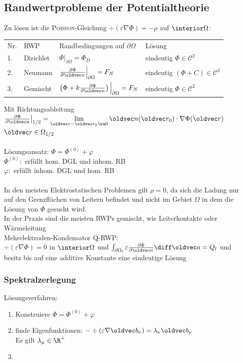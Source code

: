 \documentclass[6pt,a4paper]{scrartcl}
\let\vec\oldvec
\begin{document}
\begin{multicols}{4}
	\subsection{Randwertprobleme der Potentialtheorie}
	Zu lösen ist die \textsc{Poisson}-Gleichung $\div(\varepsilon \nabla \Phi) = -\rho$ auf $\interior \Omega$:\\
	\begin{tabular*}{\columnwidth}{@{\extracolsep\fill}llll@{}}
	Nr. & RWP & Randbedingungen auf $\partial \Omega$ & Lösung\\
	1. & Dirichlet & $\Phi\big|_{\partial\Omega} = \Phi_D$ & eindeutig $\Phi \in \mathcal C^2$\\[0.5em]
	2. & Neumann & $\frac{\partial \Phi}{\partial \vec n}\Big|_{\partial\Omega} = F_N$ & eindeutig $(\Phi + C) \in \mathcal C^2$\\[0.5em]
	3. & Gemischt & $\left( \Phi + k \frac{\partial \Phi}{\partial \vec n}\right)\Big|_{\partial\Omega} = F_N$ & eindeutig $\Phi \in \mathcal C^2$\\
	\end{tabular*} 
	Mit Richtungsableitung $\frac{\partial \Phi}{\partial \vec n}\big|_{1/2} = \lim\limits_{\vec r - \vec r_0 \ra 0} \vec n(\vec r_0) \cdot \nabla\Phi(\vec r)$ \quad $\vec r \in \Omega_{1/2}$\\
	\\
	Lösungsansatz: $\Phi = \Phi^{(0)} + \varphi$\\
	$\Phi^{(0)}:$ erfüllt hom. DGL und inhom. RB\\
	$\varphi:$ erfüllt inhom. DGL und hom. RB\\
	\\
	In den meisten Elektrostatischen Problemen gilt $\rho = 0$, da sich die Ladung nur auf den Grenzflächen von Leitern befindet und nicht im Gebiet $\Omega$ in dem die Lösung von $\Phi$ gesucht wird.\\
	In der Praxis sind die meisten RWPs gemischt, wie Leiterkontakte oder Wärmeleitung\\ 
	
	Mehrelektroden-Kondensator Q-RWP:\\
	$\div(\varepsilon \nabla \Phi) = 0$ in $\interior \Omega$ und $\int_{\partial \Omega_l} \varepsilon \frac{\partial \Phi}{\partial \vec n} \diff \vec a = Q_l$ und  besitz bis auf eine additive Konstante eine eindeutige Lösung
	
	\subsubsection*{Spektralzerlegung}
	Lösungsverfahren:\\
	\begin{enumerate}
		\item Konstruiere $\Phi = \Phi^{(0)} + \varphi$
		\item finde Eigenfunktionen: $-\div(\varepsilon \nabla \vec b_\nu) = \lambda_\nu \vec b_\nu$\\
			Es gilt $\lambda_\mu \in \R^+$
		\item 
	\end{enumerate}
	

\end{multicols}
\end{document}
